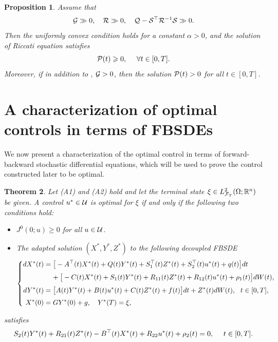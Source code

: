 \documentclass[11pt,times,twoside]{article}
\def\dbR{\mathbb{R}} \def\sR{\mathscr{R}} \def\fR{\mathfrak{R}} \def\cR{{\cal R}} \def\BR{{\bf R}} \def\Br{{\bf r}}
\def\Om{\Omega}      \def\Lm{\Lambda}     \def\Th{\Theta}
\def\ges{\geqslant}       \def\esssup{\mathop{\rm esssup}}   \def\[{\Big[}
\def\a{\alpha}        \def\G{\Gamma}   \def\g{\gamma}   \def\O{\Omega}   \def\o{\omega}
\def\ba{\begin{aligned}}              \def\ea{\end{aligned}}
\newtheorem{theorem}{Theorem}[section]
\newtheorem{proposition}[theorem]{Proposition}
\begin{document}
%
%
\begin{proposition}
Assume that
%
\begin{equation}\label{2.2}
\cG\gg0,\q\cR\gg0,\q\cQ-\cS^\top\cR^{-1}\cS\gg0.
\end{equation}
%
Then the uniformly convex condition  holds for a constant $\a>0$, and the solution of Riccati equation  satisfies
%
$$\cP(t)\ges0,\q~\forall t\in[0,T].$$
%
Moreover, if in addition to , ${\cal G}>0$, then the solution ${\cal P}(t)>0$ for all $t\in[0,T]$.
%
\end{proposition}





\section{A characterization of optimal controls in terms of FBSDEs}

We now present a characterization of the optimal control in terms of forward-backward stochastic differential equations, which will be used to prove the control constructed later to be optimal.
%
\begin{theorem}\label{Thm3.1}
Let (A1) and (A2) hold and let the terminal state  $\xi\in L^2_{\cF_T}(\Om;\dbR^n)$ be given.
A control $u^*\in{\cal U}$ is optimal for $\xi$ if and only if the following two conditions hold:
\begin{itemize}
  \item [(i)] $J^0(0;u)\ges0$ for all $u\in{\cal U}$.
  \item [(ii)] The adapted solution $(X^*,Y^*,Z^*)$ to the following decoupled FBSDE
%
$$\left\{\ba
\ds dX^*(t) &= \big[-A^\top(t)X^*(t)+Q(t)Y^*(t)+S^\top_1(t)Z^*(t)+S^\top_2(t)u^*(t)+q(t)\big]dt\\
%
\ns\ds &\hp{=\ } +\big[-C(t)X^*(t)+S_1(t)Y^*(t)
+R_{11}(t)Z^*(t)+R_{12}(t)u^*(t)+\rho_1(t)\big]dW(t),\\
%
\ns\ds dY^*(t) &= \big[A(t)Y^*(t)+B(t)u^*(t)+C(t)Z^*(t)+f(t)\big]dt+Z^*(t)dW(t),\ \ t\in[0,T],\\
%
\ns\ds X^*(0) &= GY^*(0)+g,\q Y^*(T)=\xi,
%
\ea\right.$$
%
\end{itemize}
satisfies
\begin{align}\label{3.2}
  S_2(t)Y^*(t)+R_{21}(t)Z^*(t)-B^\top(t)X^*(t)+R_{22}u^*(t) +\rho_2(t)=0,\quad~ t\in[0,T].
\end{align}
%
\end{theorem}
\end{document}
